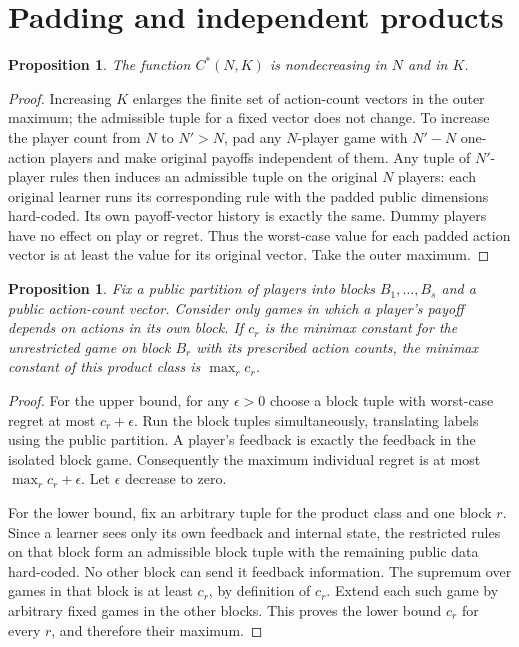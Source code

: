 \documentclass[11pt]{article}
\newtheorem{proposition}[theorem]{Proposition}
\begin{document}
\section{Padding and independent products}
\begin{proposition}\label{prop:monotone}
The function $C^*(N,K)$ is nondecreasing in $N$ and in $K$.
\end{proposition}
\begin{proof}
Increasing $K$ enlarges the finite set of action-count vectors in the
outer maximum; the admissible tuple for a fixed vector does not change.
To increase the player count from $N$ to $N'>N$, pad any $N$-player
game with $N'-N$ one-action players and make original payoffs independent
of them. Any tuple of $N'$-player rules then induces an admissible tuple
on the original $N$ players: each original learner runs its corresponding
rule with the padded public dimensions hard-coded. Its own payoff-vector
history is exactly the same. Dummy players have no effect on play or
regret. Thus the worst-case value for each padded action vector is at
least the value for its original vector. Take the outer maximum.
\end{proof}

\begin{proposition}\label{prop:products}
Fix a public partition of players into blocks $B_1,\ldots,B_s$ and a
public action-count vector. Consider only games in which a player's
payoff depends on actions in its own block. If $c_r$ is the minimax
constant for the unrestricted game on block $B_r$ with its prescribed
action counts, the minimax constant of this product class is
$\max_rc_r$.
\end{proposition}
\begin{proof}
For the upper bound, for any $\epsilon>0$ choose a block tuple with
worst-case regret at most $c_r+\epsilon$. Run the block tuples
simultaneously, translating labels using the public partition. A player's
feedback is exactly the feedback in the isolated block game. Consequently
the maximum individual regret is at most $\max_rc_r+\epsilon$.
Let $\epsilon$ decrease to zero.

For the lower bound, fix an arbitrary tuple for the product class and
one block $r$. Since a learner sees only its own feedback and internal
state, the restricted rules on that block form an admissible block tuple
with the remaining public data hard-coded. No other block can send it
feedback information. The supremum over games in that block is at least
$c_r$, by definition of $c_r$. Extend each such game by arbitrary fixed
games in the other blocks. This proves the lower bound $c_r$ for every
$r$, and therefore their maximum.
\end{proof}
\end{document}
